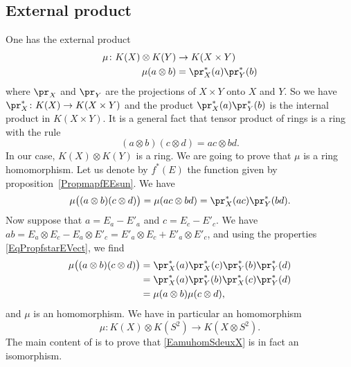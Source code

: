 \subsection{External product}

One has the external product
\begin{equation}
	\begin{aligned}
		\mu\colon K(X)\otimes K(Y) & \to K(X\times Y)       \\
		\mu(a\otimes b)            & = \pr_X^*(a)\pr^*_Y(b)
	\end{aligned}
\end{equation}
where $\pr_X$ and $\pr_Y$ are the projections of $X\times Y$ onto $X$ and $Y$. So we have $\pr_X^*\colon K(X)\to K(X\times Y)$ and the product $\pr_X^*(a)\pr^*_Y(b) $ is the internal product in $K(X\times Y)$. It is a general fact that tensor product of rings is a ring with the rule
\begin{equation}
	(a\otimes b)(c\otimes d)=ac\otimes bd.
\end{equation}
In our case, $K(X)\otimes K(Y)$ is a ring. We are going to prove that $\mu$ is a ring homomorphism. Let us denote by $f^*(E)$ the function given by proposition~\ref{PropmapfEEsun}. We have
\[
	\mu\big( (a\otimes b)(c\otimes d) \big)=\mu(ac\otimes bd)=\pr^*_X(ac)\pr^*_Y(bd).
\]
Now suppose that $a=E_a-E'_a$ and $c=E_c-E'_c$. We have $ab=E_a\otimes E_c-E_a\otimes E'_c=E'_a\otimes E_c+E'_a\otimes E'_c$, and using the properties \eqref{EqPropfstarEVect}, we find
\begin{align*}
	\mu\big( (a\otimes b)(c\otimes d) \big) & =\pr^*_X(a)\pr^*_X(c)\pr^*_Y(b)\pr^*_Y(d) \\
	                                        & =\pr^*_X(a)\pr^*_Y(b)\pr^*_X(c)\pr^*_Y(d) \\
	                                        & =\mu(a\otimes b)\mu(c\otimes d),
\end{align*}
and $\mu$ is an homomorphism. We have in particular an homomorphism
\begin{equation}		\label{EamuhomSdeuxX}
	\mu\colon K(X)\otimes K(S^2)\to K(X\otimes S^2).
\end{equation}
The main content of  is to prove that \eqref{EamuhomSdeuxX} is in fact an isomorphism.


